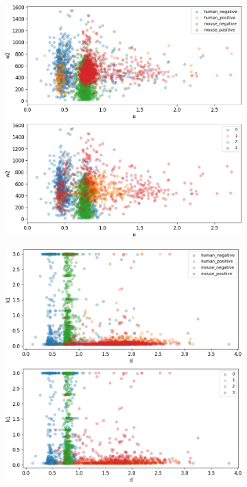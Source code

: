 \begin{figure}
	\begin{subfigure}{0.49\textwidth}
		\includegraphics[width=\textwidth]{fig/seperate_u_w2}
	\end{subfigure}
	\hfill
	\begin{subfigure}{0.49\textwidth}
		\includegraphics[width=\textwidth]{fig/seperate_d_k1}

\end{subfigure}
\end{figure}
